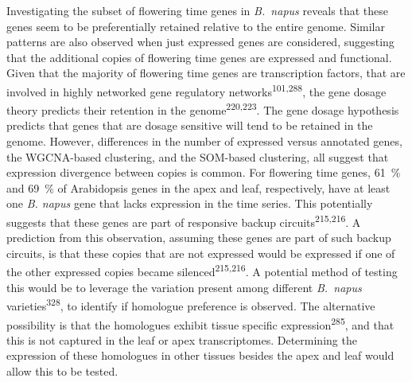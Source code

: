 \documentclass[12pt,]{book}
\begin{document}
Investigating the subset of flowering time genes in \emph{B.~napus}
reveals that these genes seem to be preferentially retained relative to
the entire genome. Similar patterns are also observed when just
expressed genes are considered, suggesting that the additional copies of
flowering time genes are expressed and functional. Given that the
majority of flowering time genes are transcription factors, that are
involved in highly networked gene regulatory
networks\textsuperscript{101,288}, the gene dosage theory predicts their
retention in the genome\textsuperscript{220,223}. The gene dosage
hypothesis predicts that genes that are dosage sensitive will tend to be
retained in the genome. However, differences in the number of expressed
versus annotated genes, the WGCNA-based clustering, and the SOM-based
clustering, all suggest that expression divergence between copies is
common. For flowering time genes, 61~\% and 69~\% of Arabidopsis genes
in the apex and leaf, respectively, have at least one \emph{B. napus}
gene that lacks expression in the time series. This potentially suggests
that these genes are part of responsive backup
circuits\textsuperscript{215,216}. A prediction from this observation,
assuming these genes are part of such backup circuits, is that these
copies that are not expressed would be expressed if one of the other
expressed copies became silenced\textsuperscript{215,216}. A potential
method of testing this would be to leverage the variation present among
different \emph{B.~napus} varieties\textsuperscript{328}, to identify if
homologue preference is observed. The alternative possibility is that
the homologues exhibit tissue specific expression\textsuperscript{285},
and that this is not captured in the leaf or apex transcriptomes.
Determining the expression of these homologues in other tissues besides
the apex and leaf would allow this to be tested.
\end{document}
